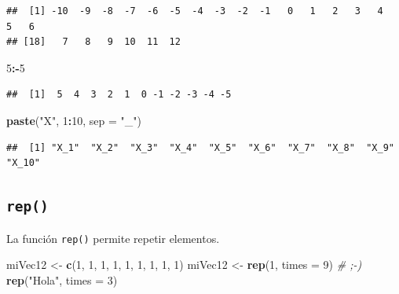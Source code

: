 \documentclass[]{book}
\newenvironment{Shaded}{\begin{snugshade}}{\end{snugshade}}
\newcommand{\KeywordTok}[1]{\textcolor[rgb]{0.13,0.29,0.53}{\textbf{#1}}}
\newcommand{\DataTypeTok}[1]{\textcolor[rgb]{0.13,0.29,0.53}{#1}}
\newcommand{\DecValTok}[1]{\textcolor[rgb]{0.00,0.00,0.81}{#1}}
\newcommand{\StringTok}[1]{\textcolor[rgb]{0.31,0.60,0.02}{#1}}
\newcommand{\CommentTok}[1]{\textcolor[rgb]{0.56,0.35,0.01}{\textit{#1}}}
\newcommand{\OperatorTok}[1]{\textcolor[rgb]{0.81,0.36,0.00}{\textbf{#1}}}
\newcommand{\NormalTok}[1]{#1}
\begin{document}
\begin{verbatim}
##  [1] -10  -9  -8  -7  -6  -5  -4  -3  -2  -1   0   1   2   3   4   5   6
## [18]   7   8   9  10  11  12
\end{verbatim}

\begin{Shaded}
\begin{Highlighting}[]
\DecValTok{5}\OperatorTok{:-}\DecValTok{5}
\end{Highlighting}
\end{Shaded}

\begin{verbatim}
##  [1]  5  4  3  2  1  0 -1 -2 -3 -4 -5
\end{verbatim}

\begin{Shaded}
\begin{Highlighting}[]
\KeywordTok{paste}\NormalTok{(}\StringTok{"X"}\NormalTok{, }\DecValTok{1}\OperatorTok{:}\DecValTok{10}\NormalTok{, }\DataTypeTok{sep =} \StringTok{"_"}\NormalTok{)}
\end{Highlighting}
\end{Shaded}

\begin{verbatim}
##  [1] "X_1"  "X_2"  "X_3"  "X_4"  "X_5"  "X_6"  "X_7"  "X_8"  "X_9"  "X_10"
\end{verbatim}

\subsection{\texorpdfstring{\texttt{rep()}}{rep()}}\label{l015rep}

La función \texttt{rep()} permite repetir elementos.

\begin{Shaded}
\begin{Highlighting}[]
\NormalTok{miVec12 <-}\StringTok{ }\KeywordTok{c}\NormalTok{(}\DecValTok{1}\NormalTok{, }\DecValTok{1}\NormalTok{, }\DecValTok{1}\NormalTok{, }\DecValTok{1}\NormalTok{, }\DecValTok{1}\NormalTok{, }\DecValTok{1}\NormalTok{, }\DecValTok{1}\NormalTok{, }\DecValTok{1}\NormalTok{, }\DecValTok{1}\NormalTok{)}
\NormalTok{miVec12 <-}\StringTok{ }\KeywordTok{rep}\NormalTok{(}\DecValTok{1}\NormalTok{, }\DataTypeTok{times =} \DecValTok{9}\NormalTok{) }\CommentTok{# ;-)}
\KeywordTok{rep}\NormalTok{(}\StringTok{"Hola"}\NormalTok{, }\DataTypeTok{times =} \DecValTok{3}\NormalTok{)}
\end{Highlighting}
\end{Shaded}
\end{document}
